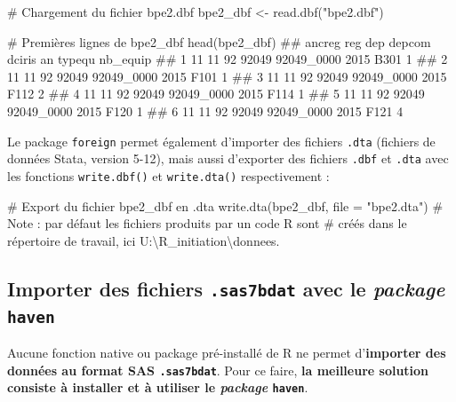 \documentclass[12pt,twosided, notitlepage]{book}
\newenvironment{Shaded}{}{}
\newcommand{\KeywordTok}[1]{\textcolor[rgb]{0.00,0.00,1.00}{{#1}}}
\newcommand{\DataTypeTok}[1]{{#1}}
\newcommand{\StringTok}[1]{\textcolor[rgb]{0.00,0.50,0.50}{{#1}}}
\newcommand{\CommentTok}[1]{\textcolor[rgb]{0.00,0.50,0.00}{{#1}}}
\newcommand{\NormalTok}[1]{{#1}}
\renewenvironment{Shaded}{\begin{snugshade}}{\end{snugshade}}
\begin{document}
\begin{Shaded}
\begin{Highlighting}[]
\CommentTok{# Chargement du fichier bpe2.dbf}
\NormalTok{bpe2_dbf <-}\StringTok{ }\KeywordTok{read.dbf}\NormalTok{(}\StringTok{"bpe2.dbf"}\NormalTok{)}

\CommentTok{# Premières lignes de bpe2_dbf}
\KeywordTok{head}\NormalTok{(bpe2_dbf)}
  \NormalTok{##   ancreg reg dep depcom     dciris   an typequ nb_equip}
  \NormalTok{## 1     11  11  92  92049 92049_0000 2015   B301        1}
  \NormalTok{## 2     11  11  92  92049 92049_0000 2015   F101        1}
  \NormalTok{## 3     11  11  92  92049 92049_0000 2015   F112        2}
  \NormalTok{## 4     11  11  92  92049 92049_0000 2015   F114        1}
  \NormalTok{## 5     11  11  92  92049 92049_0000 2015   F120        1}
  \NormalTok{## 6     11  11  92  92049 92049_0000 2015   F121        4}
\end{Highlighting}
\end{Shaded}

Le package \texttt{foreign} permet également d'importer des fichiers
\texttt{.dta} (fichiers de données Stata, version 5-12), mais aussi
d'exporter des fichiers \texttt{.dbf} et \texttt{.dta} avec les
fonctions \texttt{write.dbf()} et
\texttt{write.dta()} respectivement :

\begin{Shaded}
\begin{Highlighting}[]
\CommentTok{# Export du fichier bpe2_dbf en .dta}
\KeywordTok{write.dta}\NormalTok{(bpe2_dbf, }\DataTypeTok{file =} \StringTok{"bpe2.dta"}\NormalTok{)}
\CommentTok{# Note : par défaut les fichiers produits par un code R sont}
\CommentTok{# créés dans le répertoire de travail, ici U:\textbackslash{}R_initiation\textbackslash{}donnees.}
\end{Highlighting}
\end{Shaded}

\subsection{\texorpdfstring{Importer des fichiers \texttt{.sas7bdat}
avec le \emph{package}
\texttt{haven}}{Importer des fichiers .sas7bdat avec le package haven}}\label{importer-des-fichiers-.sas7bdat-avec-le-package-haven}

Aucune fonction native ou package pré-installé de R ne permet
d'\textbf{importer des données au format SAS \texttt{.sas7bdat}}. Pour
ce faire, \textbf{la meilleure solution consiste à installer et à
utiliser le \emph{package} \texttt{haven}}.
\end{document}
